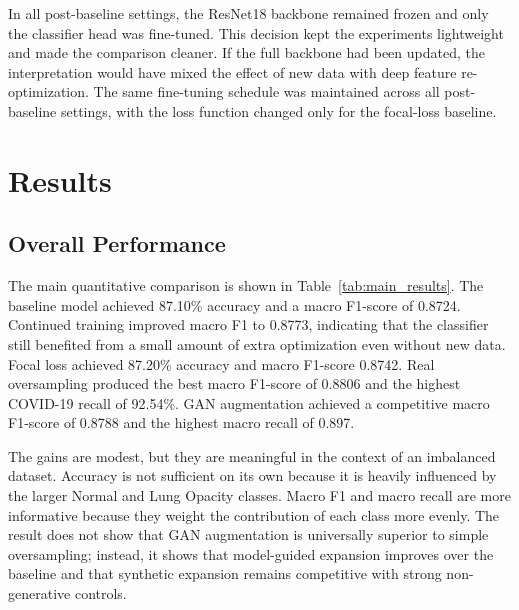 \documentclass[conference]{IEEEtran}
\begin{document}
In all post-baseline settings, the ResNet18 backbone remained frozen and only the classifier head was fine-tuned. This decision kept the experiments lightweight and made the comparison cleaner. If the full backbone had been updated, the interpretation would have mixed the effect of new data with deep feature re-optimization. The same fine-tuning schedule was maintained across all post-baseline settings, with the loss function changed only for the focal-loss baseline.

\section{Results}
\subsection{Overall Performance}
The main quantitative comparison is shown in Table~\ref{tab:main_results}. The baseline model achieved 87.10\% accuracy and a macro F1-score of 0.8724. Continued training improved macro F1 to 0.8773, indicating that the classifier still benefited from a small amount of extra optimization even without new data. Focal loss achieved 87.20\% accuracy and macro F1-score 0.8742. Real oversampling produced the best macro F1-score of 0.8806 and the highest COVID-19 recall of 92.54\%. GAN augmentation achieved a competitive macro F1-score of 0.8788 and the highest macro recall of 0.897.

The gains are modest, but they are meaningful in the context of an imbalanced dataset. Accuracy is not sufficient on its own because it is heavily influenced by the larger Normal and Lung Opacity classes. Macro F1 and macro recall are more informative because they weight the contribution of each class more evenly. The result does not show that GAN augmentation is universally superior to simple oversampling; instead, it shows that model-guided expansion improves over the baseline and that synthetic expansion remains competitive with strong non-generative controls.

\begin{table}[t]
\caption{Main experimental results on the held-out test set}
\label{tab:main_results}
\centering
\scriptsize
\setlength{\tabcolsep}{3pt}
\end{table}
\end{document}
